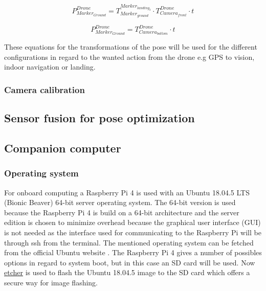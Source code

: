 \documentclass[../Head/report.tex]{subfiles}
\begin{document}
\begin{equation}
	P^{Drone}_{Marker_{Ground}} = T^{Marker_{landing_3}}_{Marker_{ground}} \cdot T^{Drone}_{Camera_{front}} \cdot t
	\label{eq:translation_drone2ground_landing3}   
\end{equation} 

\begin{equation}
	P^{Drone}_{Marker_{Ground}} = T^{Drone}_{Camera_{bottom}} \cdot t 
	\label{eq:translation_drone2ground}  
\end{equation}

These equations for the transformations of the pose will be used for the different configurations in regard to the wanted action from the drone e.g GPS to vision, indoor navigation or landing.    

\subsubsection{Camera calibration}

\subsection{Sensor fusion for pose optimization}
\label{sec:sensor_fusion_for_pose_optimization}

\subsection{Companion computer}
\label{sec:companion_computer}

\subsubsection{Operating system}

For onboard computing a Raspberry Pi 4 is used with an Ubuntu 18.04.5 LTS (Bionic Beaver) 64-bit server operating system. The 64-bit version is used because the Raspberry Pi 4 is build on a 64-bit architecture and the server edition is chosen to minimize overhead because the graphical user interface (GUI) is not needed as the interface used for communicating to the Raspberry Pi will be through ssh from the terminal. The mentioned operating system can be fetched from the official Ubuntu website \cite{ubuntuImage}. The Raspberry Pi 4 gives a number of possibles options in regard to system boot, but in this case an SD card will be used. Now  \href{https://www.balena.io/etcher/}{etcher} is used to flash the Ubuntu 18.04.5 image to the SD card which offers a secure way for image flashing. 
\end{document}

